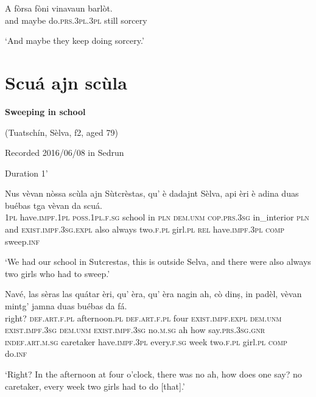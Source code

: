 \begin{linenumbers} 
\gll    A fòrsa fòni vinavaun barlòt. \\
and maybe do.\textsc{prs.3pl.3pl} still sorcery\\
\end{linenumbers}
\medskip
\glt `And maybe they keep doing sorcery.'
\medskip

\section{Scuá ajn scùla}

\noindent
\textbf{Sweeping in school}

\noindent
(Tuatschín, Sèlva, f2, aged 79)

\noindent
Recorded 2016/06/08 in Sedrun

\noindent
Duration 1'

\bigskip

\begin{linenumbers}
\gll Nus vèvan nòssa scùla ajn Sùtcrèstas, qu’ è dadajnt Sèlva, api èri è adina duas buébas tga vèvan da scuá. \\
  \textsc{1pl} have.\textsc{impf.1pl} \textsc{poss.1pl.f.sg} school in \textsc{pln} \textsc{dem.unm} \textsc{cop.prs.3sg} in\_interior \textsc{pln} and \textsc{exist.impf.3sg.expl} also always two.\textsc{f.pl} girl.\textsc{pl} \textsc{rel} have.\textsc{impf.3pl} \textsc{comp} sweep.\textsc{inf}\\
 \end{linenumbers}
 \medskip
\glt `We had our school in Sutcrestas, this is outside Selva, and there were also always two girls who had to sweep.'
\medskip

\begin{linenumbers}
\gll   Navé, las sèras las quátar èri, qu' èra, qu’ èra nagin ah, cò dinṣ, in padèl, vèvan mintg’ jamna duas buébas da fá.\\
 right? \textsc{def.art.f.pl} afternoon.\textsc{pl} \textsc{def.art.f.pl} four \textsc{exist.impf.expl} \textsc{dem.unm} \textsc{exist.impf.3sg} \textsc{dem.unm} \textsc{exist.impf.3sg} no.\textsc{m.sg} ah how say.\textsc{prs.3sg.gnr} \textsc{indef.art.m.sg} caretaker have.\textsc{impf.3pl} every.\textsc{f.sg} week two.\textsc{f.pl} girl.\textsc{pl} \textsc{comp} do.\textsc{inf}\\
\end{linenumbers}
\medskip
\glt `Right? In the afternoon at four o’clock, there was no ah, how does one say? no caretaker, every week two girls had to do [that].'
\medskip

